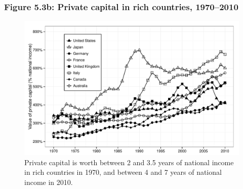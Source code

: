 \documentclass[t]{beamer}\usepackage[]{graphicx}\usepackage[]{color}
\newenvironment{knitrout}{}{} %
\begin{document}
\begin{frame}[label=Figure_5_3b]
\frametitle{Figure 5.3b: Private capital in rich countries, 1970--2010}
\begin{figure}[t]
\begin{minipage}[b]{\textwidth}
\centering
\begin{knitrout}\footnotesize
{}\color{fgcolor}

{\centering \includegraphics[width=1\linewidth]{figures/bw/Figure_5_3b} 

}



\end{knitrout}
\caption{Private capital is worth between 2 and 3.5 years of national income in rich countries in 1970, and between 4 and 7 years of national income in 2010.}
\end{minipage}
\end{figure}
\end{frame}
\end{document}
